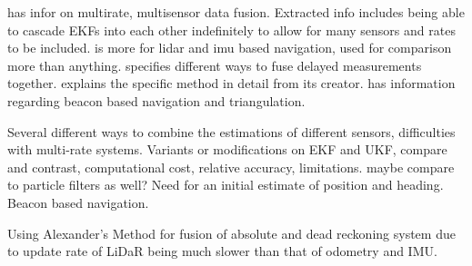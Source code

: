 \cite{multi} has infor on multirate, multisensor data fusion. Extracted info includes being able to cascade EKFs into each other indefinitely to allow for many sensors and rates to be included. \cite{indoor} is more for lidar and imu based navigation, used for comparison more than anything. \cite{delayed} specifies different ways to fuse delayed measurements together. \cite{alex} explains the specific method in detail from its creator. \cite{beacon} has information regarding beacon based navigation and triangulation.\par

Several different ways to combine the estimations of different sensors, difficulties with multi-rate systems. Variants or modifications on EKF and UKF, compare and contrast, computational cost, relative accuracy, limitations. maybe compare to particle filters as well? Need for an initial estimate of position and heading. Beacon based navigation.\par
	Using Alexander's Method for fusion of absolute and dead reckoning system due to update rate of LiDaR being much slower than that of odometry and IMU.
